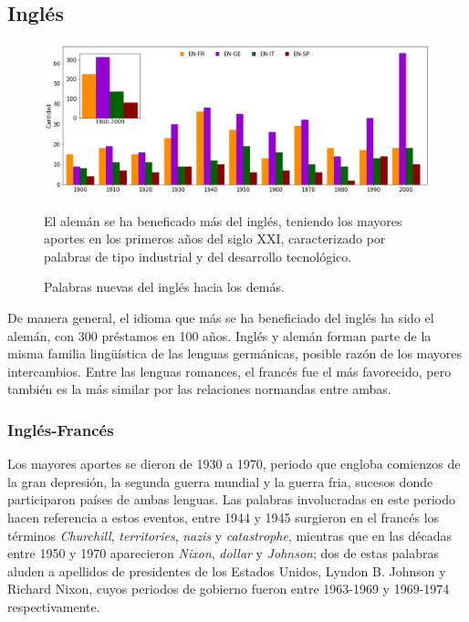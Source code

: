 \subsection{Inglés} %

\begin{figure} %
	\centering
	\includegraphics[scale=.38]{Cap_3/NC_EN.png}
	\label{fig.NC_EN}
	\caption{Palabras nuevas del inglés hacia los demás.}
	\smallskip
	\small
	El alemán se ha beneficado más del inglés, teniendo los mayores aportes en los primeros años del siglo XXI, caracterizado por palabras de tipo industrial y del desarrollo tecnológico.
\end{figure} %

De manera general, el idioma que más se ha beneficiado del inglés ha sido el
alemán, con 300 préstamos en 100 años.  Inglés y alemán forman parte de la
misma familia lingüística de las lenguas germánicas,  posible razón de los
mayores intercambios. Entre las lenguas romances, el francés fue el más
favorecido, pero también es la más similar por las relaciones normandas entre
ambas.
\subsubsection*{Inglés-Francés} %

Los mayores aportes se dieron de 1930 a 1970, periodo que engloba comienzos de
la gran depresión, la segunda guerra mundial y la guerra fria, sucesos donde
participaron países de ambas lenguas. Las palabras involucradas en este periodo
hacen referencia a estos eventos, entre 1944 y 1945 surgieron en el francés los
términos \textit{Churchill}, \textit{territories}, \textit{nazis} y
\textit{catastrophe},  mientras que en las décadas entre 1950 y 1970
aparecieron \textit{Nixon}, \textit{dollar} y \textit{Johnson}; dos de estas
palabras aluden a apellidos de presidentes de los Estados Unidos,  Lyndon B.
Johnson y Richard Nixon, cuyos periodos de gobierno fueron  entre 1963-1969 y
1969-1974 respectivamente.

